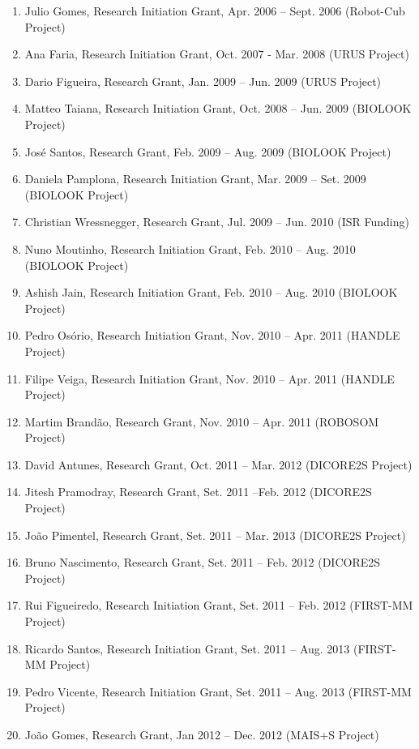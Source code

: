 \begin{enumerate}
\def\labelenumi{\arabic{enumi}.}
\item
  Julio Gomes, Research Initiation Grant, Apr. 2006 -- Sept. 2006
  (Robot-Cub Project)
\item
  Ana Faria, Research Initiation Grant, Oct. 2007 - Mar. 2008 (URUS
  Project)
\item
  Dario Figueira, Research Grant, Jan. 2009 -- Jun. 2009 (URUS Project)
\item
  Matteo Taiana, Research Initiation Grant, Oct. 2008 -- Jun. 2009
  (BIOLOOK Project)
\item
  José Santos, Research Grant, Feb. 2009 -- Aug. 2009 (BIOLOOK Project)
\item
  Daniela Pamplona, Research Initiation Grant, Mar. 2009 -- Set. 2009
  (BIOLOOK Project)
\item
  Christian Wressnegger, Research Grant, Jul. 2009 -- Jun. 2010 (ISR
  Funding)
\item
  Nuno Moutinho, Research Initiation Grant, Feb. 2010 -- Aug. 2010
  (BIOLOOK Project)
\item
  Ashish Jain, Research Initiation Grant, Feb. 2010 -- Aug. 2010
  (BIOLOOK Project)
\item
  Pedro Osório, Research Initiation Grant, Nov. 2010 -- Apr. 2011
  (HANDLE Project)
\item
  Filipe Veiga, Research Initiation Grant, Nov. 2010 -- Apr. 2011
  (HANDLE Project)
\item
  Martim Brandão, Research Grant, Nov. 2010 -- Apr. 2011 (ROBOSOM
  Project)
\item
  David Antunes, Research Grant, Oct. 2011 -- Mar. 2012 (DICORE2S
  Project)
\item
  Jitesh Pramodray, Research Grant, Set. 2011 --Feb. 2012 (DICORE2S
  Project)
\item
  João Pimentel, Research Grant, Set. 2011 -- Mar. 2013 (DICORE2S
  Project)
\item
  Bruno Nascimento, Research Grant, Set. 2011 -- Feb. 2012 (DICORE2S
  Project)
\item
  Rui Figueiredo, Research Initiation Grant, Set. 2011 -- Feb. 2012
  (FIRST-MM Project)
\item
  Ricardo Santos, Research Initiation Grant, Set. 2011 -- Aug. 2013
  (FIRST-MM Project)
\item
  Pedro Vicente, Research Initiation Grant, Set. 2011 -- Aug. 2013
  (FIRST-MM Project)
\item
  João Gomes, Research Grant, Jan 2012 -- Dec. 2012 (MAIS+S Project)

\end{enumerate}
